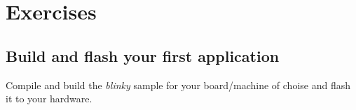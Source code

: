 \section{Exercises}

\subsection{Build and flash your first application}

\begin{exercise}
Compile and build the \emph{blinky} sample for your board/machine of choise and flash it to your hardware. 
\end{exercise}




% 


% 
% 

